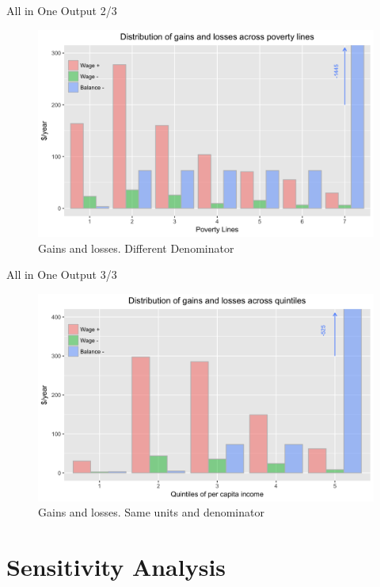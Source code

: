 \documentclass{beamer}
\begin{document}
\begin{frame}{All in One Output 2/3}
\begin{figure}[h!]
\centering
\hspace*{-3em}
\includegraphics[scale = 0.13]{../Images/alt_pe2}
\caption{Gains and losses. Different Denominator}
\end{figure}	
\end{frame}

\begin{frame}{All in One Output 3/3}
\begin{figure}[h!]
\centering
\hspace*{-3em}
\includegraphics[scale = 0.13]{../Images/policy_est}
\caption{Gains and losses. Same units and denominator}
\end{figure}	
\end{frame}


\section{Sensitivity Analysis}
\end{document}
